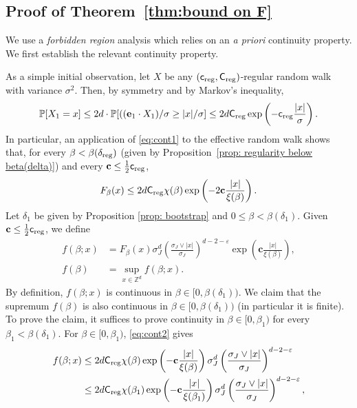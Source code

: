\documentclass[11pt,a4paper]{article}
\numberwithin{equation}{section}
\theoremstyle{plain}
\theoremstyle{definition}
\newcommand\1{\mathds{1}}
\newcommand\bfc{\mathbf{c}}
\newcommand\creg{\mathsf{c}_{\textup{reg}}}
\newcommand\Creg{\mathsf{C}_{\textup{reg}}}
\begin{document}
\subsection{Proof of Theorem~\textup{\ref{thm:bound on F}}}


We use a \emph{forbidden region} analysis which relies on
an {\it a priori} continuity property.  We
first establish the relevant
continuity property.

As a simple initial observation, let $X$ be any
$(\creg,\Creg)$-regular random walk  with variance $\sigma^2$.
Then, by symmetry and by Markov's inequality,
\begin{align}
\label{eq:cont1}
    \mathbb P[X_1=x]
    \le
    2d\cdot
    \mathbb P[((\mathbf{e}_1 \cdot X_1)/\sigma \ge |x|/\sigma] \le
    2d \Creg \exp\left(-\creg \frac{|x|}{\sigma}\right).
\end{align}
In particular, an application of \eqref{eq:cont1} to the effective random walk shows that, for every $\beta < \beta(\delta_{\textup{reg}})$ (given by Proposition~\ref{prop: regularity below beta(delta)}) and every
$\bfc \le \frac 12 \creg$,
\begin{equation}
\label{eq:cont2}
    F_\beta(x) \le 2d \Creg \chi(\beta) \exp\left(-2\bfc \frac{|x|}{\xi(\beta)}\right).
\end{equation}
Let $\delta_1$ be given by Proposition \ref{prop: bootstrap} and $0 \le \beta<\beta(\delta_1)$.
Given $\bfc\le \frac 12 \creg$, we define
\begin{align}
        f( \beta;x) &=
        F_{\beta} (x)
        \sigma_J^d \left(\frac{\sigma_J\vee |x|}{\sigma_J}\right)^{d-2-\varepsilon}
        \exp\left(\bfc\frac{|x|}{\xi(\beta)}\right),
        \\
        f( \beta) & =\sup_{x\in \mathbb Z^d} f ( \beta;x)
        .
\label{eq:fsup}
\end{align}
By definition, $f( \beta;x)$ is continuous in $\beta\in [0,\beta(\delta_1))$.
We claim that the supremum $f(\beta)$ is
also continuous in $\beta\in [0,\beta(\delta_1))$ (in particular it is finite).
To prove the claim, it suffices to prove continuity in $\beta\in [0,\beta_1)$ for
every $\beta_1 < \beta(\delta_1)$. For $\beta\in [0,\beta_1)$, \eqref{eq:cont2} gives
\begin{align}
    f(\beta;x)
    &\le 2d \Creg \chi(\beta)\exp\left(-\bfc \frac{|x|}{\xi(\beta)}\right)\sigma_J^d \left(\frac{\sigma_J\vee |x|}{\sigma_J}\right)^{d-2-\varepsilon}
    \nonumber \\&\le
     2d \Creg \chi(\beta_1) \exp\left(-\bfc \frac{|x|}{\xi(\beta_1)}\right)
     \sigma_J^d \left(\frac{\sigma_J\vee |x|}{\sigma_J}\right)^{d-2-\varepsilon},
\label{eq:fcont}
\end{align}
\end{document}

